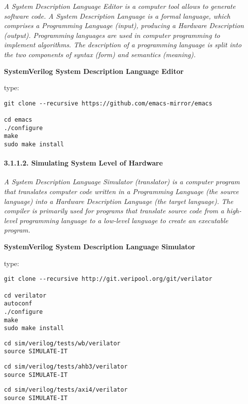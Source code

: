\documentclass[]{article}
\let\oldparagraph\paragraph
\renewcommand{\paragraph}[1]{\oldparagraph{#1}\mbox{}}
\begin{document}
\emph{A System Description Language Editor is a computer tool allows to
generate software code. A System Description Language is a formal
language, which comprises a Programming Language (input), producing a
Hardware Description (output). Programming languages are used in
computer programming to implement algorithms. The description of a
programming language is split into the two components of syntax (form)
and semantics (meaning).}

\textbf{SystemVerilog System Description Language Editor}

type:

\begin{verbatim}
git clone --recursive https://github.com/emacs-mirror/emacs

cd emacs
./configure
make
sudo make install
\end{verbatim}

\hypertarget{simulating-system-level-of-hardware}{%
\paragraph{3.1.1.2. Simulating System Level of
Hardware}\label{simulating-system-level-of-hardware}}

\emph{A System Description Language Simulator (translator) is a computer
program that translates computer code written in a Programming Language
(the source language) into a Hardware Description Language (the target
language). The compiler is primarily used for programs that translate
source code from a high-level programming language to a low-level
language to create an executable program.}

\textbf{SystemVerilog System Description Language Simulator}

type:

\begin{verbatim}
git clone --recursive http://git.veripool.org/git/verilator

cd verilator
autoconf
./configure
make
sudo make install
\end{verbatim}

\begin{verbatim}
cd sim/verilog/tests/wb/verilator
source SIMULATE-IT
\end{verbatim}

\begin{verbatim}
cd sim/verilog/tests/ahb3/verilator
source SIMULATE-IT
\end{verbatim}

\begin{verbatim}
cd sim/verilog/tests/axi4/verilator
source SIMULATE-IT
\end{verbatim}
\end{document}
